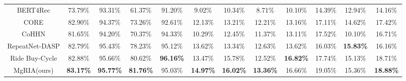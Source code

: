 \begin{table*}[htbp]
{\begin{tabular}{@{}c|cccc|cccc|ccc@{}}
BERT4Rec \cite{sun2019bert4rec} & 73.79\% & 93.31\% & 61.37\% & 91.20\%  & 9.02\%  & 10.34\% & 8.71\% & 10.10\%  & 14.39\% & 12.94\% & 14.16\%  \\ 
CORE \cite{hou2022core} & 82.90\% & 94.37\% & 73.26\% & 92.61\%  & 12.13\% & 13.21\% & 12.21\% & 13.16\%  & 17.11\% & 14.62\% & 17.42\%  \\ 
CoHHN \cite{zhang2022price} & 81.65\% & 94.20\% & 70.37\% & 94.33\%  & 10.29\% & 12.45\% & 11.37\% & 13.11\%  & 17.52\% & 10.10\% & 16.71\%  \\ 
RepeatNet-DASP \cite{wang2022generative} & 82.79\% & 95.43\% & 78.23\% & 95.12\%  & 13.62\% & 13.34\% & 12.63\% & 13.62\%  & 16.03\% & \textbf{15.83\%} & 16.16\%  \\ 
Ride Buy-Cycle \cite{katz2022learning} & 82.88\% & 95.66\% & 80.62\% & \textbf{96.16\%}  & 13.47\% & 15.78\% & 12.52\% & \textbf{16.82\%}  & 17.74\% & 15.13\% & 18.71\%  \\ \midrule
MgRIA(ours) & \textbf{83.17\%} & \textbf{95.77\%} & \textbf{81.76\%} & 95.03\%   & \textbf{14.97\%} & \textbf{16.02\%} & \textbf{13.36\%} & 16.66\%  & 19.05\% & 15.36\% & \textbf{18.88\%}  \\ 
\bottomrule
\end{tabular}
}
\end{table*}
